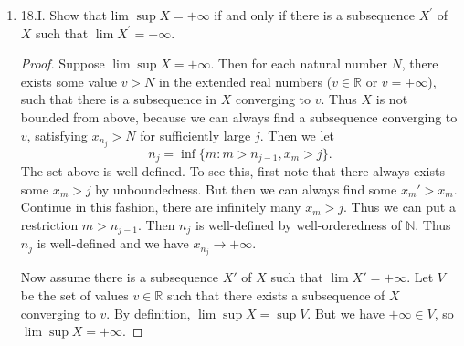 \begin{enumerate}
\begin{proof}
	Thus $x_n\le   C (L + \varepsilon)^n$ for sufficiently large $n$ for some $C$ (by using a past homework problem). Therefore
	\[
		x_n ^{\frac{1}{n}} \le  C^{\frac{1}{n}}(L + \varepsilon) \to  L + \varepsilon
	.\] 
	Thus $x_n^{\frac{1}{n}}\le L + 2\varepsilon$ for sufficeintly large $n$. To see this, pick arbitrarily small $\delta>0$, and note that $C^{\frac{1}{n}}< 1 + \delta$ for sufficiently large $n$. Hence $x_n ^{\frac{1}{n}}\le (1 + \delta)(L + \varepsilon)$ for arbitrarily small $\delta$ and $\varepsilon$. 
	Now let $\delta < \frac{\varepsilon}{(L + \varepsilon)}$, and we obtain $x_n^{\frac{1}{n}} < (1 + \frac{\varepsilon}{L + \varepsilon})(L + \varepsilon) = L + 2 \varepsilon$ for sufficiently large $n$.

	Therefore $\lim\sup x_n^{\frac{1}{n}}\le L + 2 \varepsilon$ for arbitrary $\varepsilon$. Hence $\lim\sup x_n^{\frac{1}{n}} \le L$.
\end{proof}
\item 18.I. Show that lim $\sup X=+\infty$ if and only if there is a subsequence $X^{\prime}$ of $X$ such that $\lim X^{\prime}=+\infty$.
\begin{proof}
	Suppose $\lim \sup X = + \infty $. 
	Then for each natural number $N$, there exists some value $v > N$ in the extended real numbers ($v \in \mathbb{R}$ or $v = +\infty $), such that there is a subsequence in $X$ converging to  $v$. Thus 
	$X$ is not bounded from above, because we can always find a subsequence converging to $v$, satisfying $x_{n_j}>N$ for sufficiently large $j$.
	Then we let  \[
		n_j = \operatorname{inf} 
		\{m: m > n_{j-1}, x_m > j\} 
	.\] 
	The set above is well-defined. To see this, first note that there always exists some $x_m > j$ by unboundedness. But then we can always find some $x_m' > x_m$. Continue in this fashion, there are infinitely many  $x_m > j$. Thus we can put a restriction $m > n_{j-1}$. Then $n_j$ is well-defined by well-orderedness of $\mathbb{N}$. Thus $n_j$ is well-defined and we have $x_{n_j} \to  +\infty $.

	Now assume there is a subsequence  $X'$ of $X$ such that $\lim X' = + \infty $.
	Let $V$ be the set of values $v \in \mathbb{R}$ such that there exists a subsequence of  $X$ converging to $v$. By definition, $\lim \sup X  = \operatorname{sup} V$. But we have $+\infty  \in V$, so $\lim \sup X = +\infty $.
\end{proof}

\end{enumerate}
